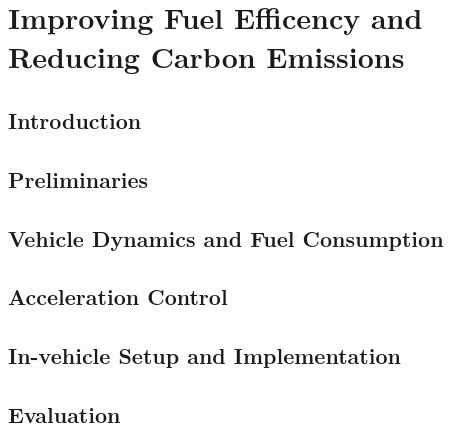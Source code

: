 
\chapter{Improving Fuel Efficency and Reducing Carbon Emissions}


\section{Introduction}




\section{Preliminaries}




\section{Vehicle Dynamics and Fuel Consumption}






\section{Acceleration Control}




\section{In-vehicle Setup and Implementation}




\section{Evaluation}





